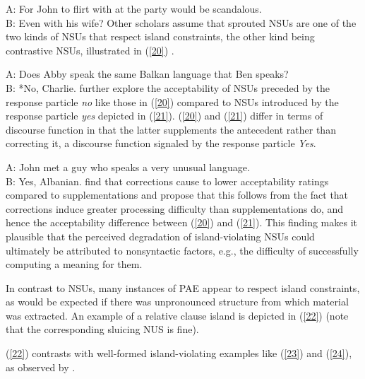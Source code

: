 {\ea A: For John to flirt with at the party would be scandalous. \\B: Even with his wife?\label{19}\z
Other scholars assume that sprouted NSUs are one of the two kinds of NSUs that respect island constraints, the other kind being contrastive NSUs, illustrated in (\ref{20}) \citep{Chung1995, Merchant2001, Griffiths2014}.

\ea A: Does Abby speak the same Balkan language that Ben speaks?\\
B: *No, Charlie. \citep{Merchant2001}  \label{20}\z
%
\citet{Schmeh2015} further explore the acceptability of NSUs preceded by the response particle \textit{no} like those in (\ref{20}) compared to NSUs introduced by the response particle \textit{yes} depicted in (\ref{21}). (\ref{20}) and (\ref{21}) differ in terms of discourse function in that the latter supplements the antecedent rather than correcting it, a discourse function signaled by the response particle \textit{Yes}.

\ea A: John met a guy who speaks a very unusual language. \\B: Yes, Albanian. \citep[245]{CJ2005a} \label{21}\z
%
\citet{Schmeh2015} find that corrections cause to
lower acceptability ratings compared to supplementations and propose that this follows from the fact that corrections induce greater processing difficulty than supplementations do, and hence the acceptability difference between (\ref{20}) and (\ref{21}). This finding makes it plausible that the perceived degradation of island-violating NSUs could ultimately be attributed to nonsyntactic factors, e.g., the difficulty of successfully computing a meaning for them.

In contrast to NSUs, many instances of PAE appear to respect island constraints, as would be expected if there was unpronounced structure from which material was extracted. An example of a relative clause island is depicted in (\ref{22}) (note that the corresponding sluicing NUS is fine).


\z
(\ref{22}) contrasts with well-formed island-violating examples like (\ref{23}) and (\ref{24}), as observed by \citet{Miller2014, Ginzburg2018}.
%
%
\eal
{}

}
